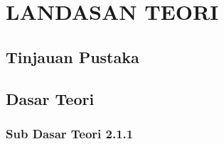 \chapter[LANDASAN TEORI]{\\ LANDASAN TEORI}

\section{Tinjauan Pustaka}

\section{Dasar Teori}
\subsection{Sub Dasar Teori 2.1.1}
